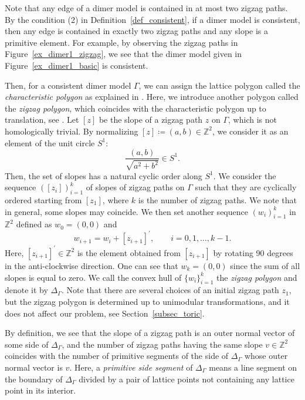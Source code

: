 \documentclass[pdftex]{sigma}
\numberwithin{equation}{section}
\theoremstyle{definition}
\newcommand{\ZZ}{\mathbb{Z}}
\begin{document}
Note that any edge of a dimer model is contained in at most two zigzag paths.
By the condition (2) in Definition~\ref{def_consistent},
if a dimer model is consistent, then any edge is contained in exactly two zigzag paths and any slope is a primitive element.
For example, by observing the zigzag paths in Figure~\ref{ex_dimer1_zigzag}, we see that the dimer model given in Figure~\ref{ex_dimer1_basic} is consistent.

Then, for a consistent dimer model $\Gamma$, we can assign the lattice polygon called the \emph{characteristic polygon} as explained in
\cite[Section~5.2]{IU_special}.
Here, we introduce another polygon called the \emph{zigzag polygon}, which coincides with the characteristic polygon up to translation, see \cite[Theorem~12.1]{IU_special}.
Let $[z]$ be the slope of a zigzag path $z$ on $\Gamma$, which is not homologically trivial.
By normalizing $[z]\coloneqq (a,b)\in\ZZ^2$, we consider it as an element of the unit circle $S^1$:
\[
\frac{(a,b)}{\sqrt{a^2+b^2}}\in S^1.
\]
Then, the set of slopes has a natural cyclic order along $S^1$.
We consider the sequence $([z_i])_{i=1}^k$ of slopes of zigzag paths on $\Gamma$ such that
they are cyclically ordered starting from $[z_1]$, where $k$ is the number of zigzag paths.
We note that in general, some slopes may coincide.
We then set another sequence $(w_i)_{i=1}^{k}$ in $\ZZ^2$ defined as $w_0=(0,0)$ and
\[
w_{i+1}=w_i+[z_{i+1}]^\prime, \qquad i=0,1,\dots,k-1.
\]
Here, $[z_{i+1}]^\prime\in\ZZ^2$ is the element obtained from $[z_{i+1}]$ by rotating 90 degrees in the anti-clockwise direction.
One can see that $w_k=(0,0)$ since the sum of all slopes is equal to zero.
We call the convex hull of $\{w_i\}_{i=1}^{k}$ the \emph{zigzag polygon} and denote it by $\Delta_\Gamma$.
Note that there are several choices of an initial zigzag path $z_1$, but the zigzag polygon is determined up to unimodular transformations,
and it does not affect our problem, see Section~\ref{subsec_toric}.

By definition, we see that the slope of a zigzag path is an outer normal vector of some side of $\Delta_\Gamma$,
and the number of zigzag paths having the same slope $v\in\ZZ^2$ coincides with the number of primitive segments of
the side of $\Delta_\Gamma$ whose outer normal vector is $v$.
Here, a \emph{primitive side segment} of $\Delta_\Gamma$ means a line segment on the boundary of $\Delta_\Gamma$
divided by a pair of lattice points not containing any lattice point in its interior.
\end{document}
